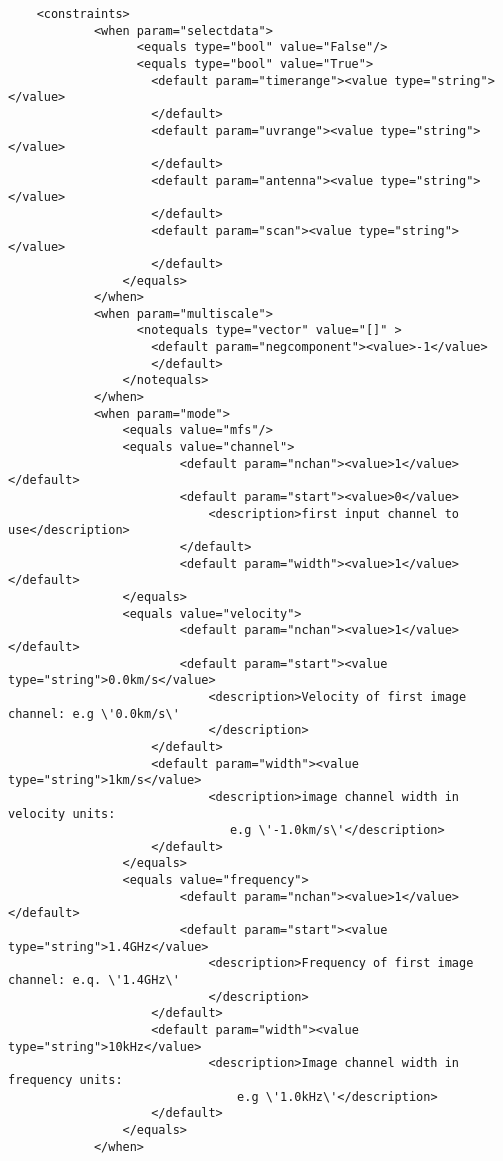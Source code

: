 \begin{verbatim}
    <constraints>
            <when param="selectdata">
                  <equals type="bool" value="False"/>
                  <equals type="bool" value="True">
                    <default param="timerange"><value type="string"></value>
                    </default>
                    <default param="uvrange"><value type="string"></value>
                    </default>
                    <default param="antenna"><value type="string"></value>
                    </default>
                    <default param="scan"><value type="string"></value>
                    </default>
                </equals>
            </when>
            <when param="multiscale">
                  <notequals type="vector" value="[]" > 
                    <default param="negcomponent"><value>-1</value>
                    </default>
                </notequals>
            </when>
            <when param="mode">
                <equals value="mfs"/>
                <equals value="channel">
                        <default param="nchan"><value>1</value></default>
                        <default param="start"><value>0</value>
                            <description>first input channel to use</description>
                        </default>
                        <default param="width"><value>1</value></default>
                </equals>
                <equals value="velocity">
                        <default param="nchan"><value>1</value></default>
                        <default param="start"><value type="string">0.0km/s</value>
                            <description>Velocity of first image channel: e.g \'0.0km/s\'
                            </description>
                    </default>
                    <default param="width"><value type="string">1km/s</value>
                            <description>image channel width in velocity units: 
                               e.g \'-1.0km/s\'</description>
                    </default>
                </equals>
                <equals value="frequency">
                        <default param="nchan"><value>1</value></default>
                        <default param="start"><value type="string">1.4GHz</value>
                            <description>Frequency of first image channel: e.q. \'1.4GHz\'
                            </description>
                    </default>
                    <default param="width"><value type="string">10kHz</value>
                            <description>Image channel width in frequency units:
                                e.g \'1.0kHz\'</description>
                    </default>
                </equals>
            </when>
            

\end{verbatim}
